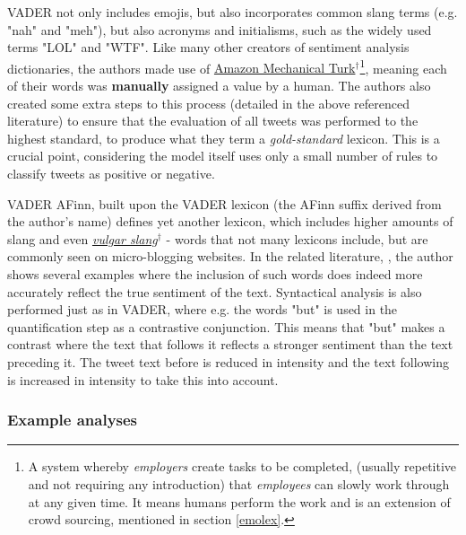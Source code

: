 \documentclass{article}
\begin{document}
VADER not only includes emojis, but also incorporates common slang terms (e.g. "nah" and "meh"), but also acronyms and initialisms, such as the widely used terms "LOL" and "WTF". Like many other creators of sentiment analysis dictionaries, the authors made use of \href{https://www.mturk.com/mturk/welcome}{Amazon Mechanical Turk$^{\dag{}}$}\footnote{A system whereby \emph{employers} create tasks to be completed, (usually repetitive and not requiring any introduction) that \emph{employees} can slowly work through at any given time. It means humans perform the work and is an extension of crowd sourcing, mentioned in section \ref{emolex}.}, meaning each of their words was \textbf{manually} assigned a value by a human. The authors also created some extra steps to this process (detailed in the above referenced literature) to ensure that the evaluation of all tweets was performed to the highest standard, to produce what they term a \emph{gold-standard} lexicon. This is a crucial point, considering the model itself uses only a small number of rules to classify tweets as positive or negative.

\vspace{5mm} \noindent
VADER AFinn, built upon the VADER lexicon (the AFinn suffix derived from the author's name) defines yet another lexicon, which includes higher amounts of slang and even \href{https://simple.wiktionary.org/wiki/Category:Vulgar}{\emph{vulgar slang$^{\dag{}}$}} - words that not many lexicons include, but are commonly seen on micro-blogging websites. In the related literature, \cite{NielsenF2011New}, the author shows several examples where the inclusion of such words does indeed more accurately reflect the true sentiment of the text. Syntactical analysis is also performed just as in VADER, where e.g. the words "but" is used in the quantification step as a contrastive conjunction. This means that "but" makes a contrast where the text that follows it reflects a stronger sentiment than the text preceding it. The tweet text before is reduced in intensity and the text following is increased in intensity to take this into account.


\subsubsection{Example analyses}
\label{sec-1-4-5}
\end{document}
